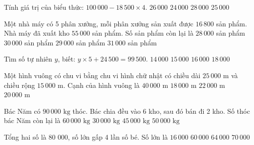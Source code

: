 \begin{ex} %
Tính giá trị của biểu thức: $100\,000 - 18\,500 \times 4$.
\choice
{\True $26\,000$}
{$24\,000$}
{$28\,000$}
{$25\,000$}
\end{ex}

\begin{ex} %
Một nhà máy có 5 phân xưởng, mỗi phân xưởng sản xuất được $16\,800$ sản phẩm. Nhà máy đã xuất kho $55\,000$ sản phẩm. Số sản phẩm còn lại là
\choice
{$28\,000$ sản phẩm}
{$30\,000$ sản phẩm}
{\True $29\,000$ sản phẩm}
{$31\,000$ sản phẩm}
\end{ex}

\begin{ex} %
Tìm số tự nhiên $y$, biết: $y \times 5 + 24\,500 = 99\,500$.
\choice
{$14\,000$}
{\True $15\,000$}
{$16\,000$}
{$18\,000$}
\end{ex}

\begin{ex} %
Một hình vuông có chu vi bằng chu vi hình chữ nhật có chiều dài $25\,000\text{ m}$ và chiều rộng $15\,000\text{ m}$. Cạnh của hình vuông là
\choice
{$40\,000\text{ m}$}
{$18\,000\text{ m}$}
{$22\,000\text{ m}$}
{\True $20\,000\text{ m}$}
\end{ex}

\begin{ex} %
Bác Năm có $90\,000\text{ kg}$ thóc. Bác chia đều vào 6 kho, sau đó bán đi 2 kho. Số thóc bác Năm còn lại là
\choice
{\True $60\,000\text{ kg}$}
{$30\,000\text{ kg}$}
{$45\,000\text{ kg}$}
{$50\,000\text{ kg}$}
\end{ex}

\begin{ex} %
Tổng hai số là 80 000, số lớn gấp 4 lần số bé. Số lớn là
\choice
{$16\,000$}
{$60\,000$}
{\True $64\,000$}
{$70\,000$}
\end{ex}

